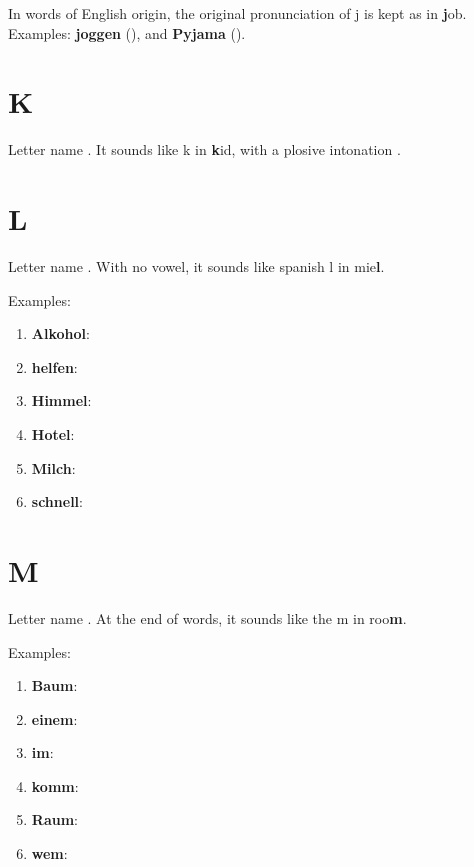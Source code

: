 In words of English origin, the original pronunciation of j is kept as in \textbf{j}ob. Examples: \textbf{joggen} (\textipa{["{\textdyoghlig}Og@n]}), and \textbf{Pyjama} (\textipa{[py"{\textdyoghlig}a:ma]}).

\section*{K}

Letter name \textipa{[ka:]}. It sounds like k in \textbf{k}id, with a plosive intonation \cite{hessen2008}.

\section*{L}

Letter name \textipa{[El]}. With no vowel, it sounds like spanish l in mie\textbf{l}.

Examples:
\begin{enumerate}
    \item \textbf{Alkohol}: \textipa{["alkoho:l]}
    \item \textbf{helfen}: \textipa{["hElf@n]}
    \item \textbf{Himmel}: \textipa{["hIm@l]}
    \item \textbf{Hotel}: \textipa{[ho"tEl]}
    \item \textbf{Milch}: \textipa{[mil\c{c}]}
    \item \textbf{schnell}: \textipa{[SnEl]}
\end{enumerate}

\section*{M}

Letter name \textipa{[Em]}. At the end of words, it sounds like the m in roo\textbf{m}.

Examples:
\begin{enumerate}
    \item \textbf{Baum}: \textipa{[baUm]}
    \item \textbf{einem}: \textipa{["aIn@m]}
    \item \textbf{im}: \textipa{[Im]}
    \item \textbf{komm}: \textipa{[kOm]}
    \item \textbf{Raum}: \textipa{[raUm]}
    \item \textbf{wem}: \textipa{[ve:m]}
\end{enumerate}

